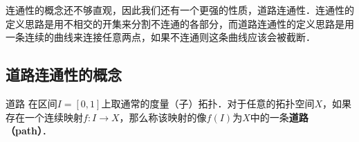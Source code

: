 连通性的概念还不够直观，因此我们还有一个更强的性质，道路连通性．连通性的定义思路是用不相交的开集来分割不连通的各部分，而道路连通性的定义思路是用一条连续的曲线来连接任意两点，如果不连通则这条曲线应该会被截断．

\subsection{道路连通性的概念}
\begin{definition}{道路}
在区间$I=[0,1]$上取通常的度量（子）拓扑．对于任意的拓扑空间$X$，如果存在一个连续映射$f: I\rightarrow X$，那么称该映射的像$f(I)$为$X$中的一条\textbf{道路（path）}．
\end{definition}